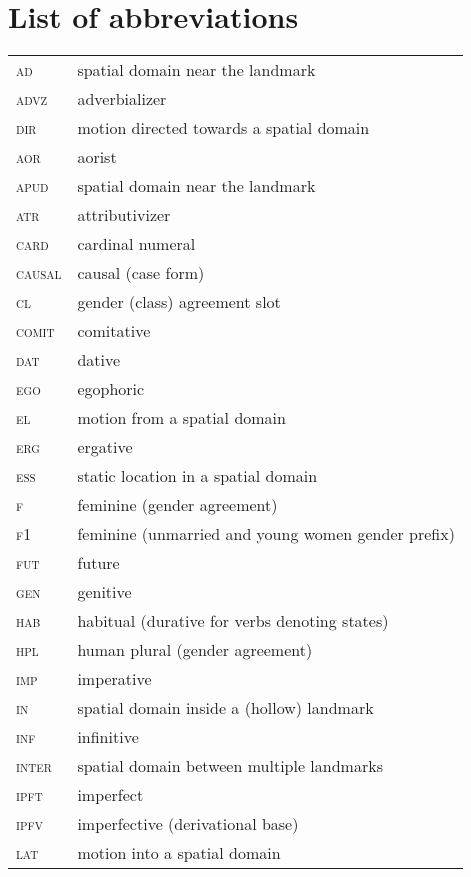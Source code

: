﻿\documentclass[output=paper]{langsci/langscibook}
\begin{document}

\section*{List of abbreviations}

\begin{longtable}[l]{@{}ll@{}}
\textsc{ad}	& spatial domain near the landmark \\
\textsc{advz}	& adverbializer \\
\textsc{dir}	& motion directed towards a spatial domain \\
\textsc{aor}	& aorist \\
\textsc{apud}	& spatial domain near the landmark \\
\textsc{atr}	& attributivizer \\
\textsc{card}	& cardinal numeral \\
\textsc{causal}	& causal (case form) \\
\textsc{cl}	& gender (class) agreement slot \\
\textsc{comit}	& comitative \\
\textsc{dat}	& dative \\
\textsc{ego}	& egophoric \\
\textsc{el}	& motion from a spatial domain \\
\textsc{erg}	& ergative \\
\textsc{ess}	& static location in a spatial domain \\
\textsc{f}	& feminine (gender agreement) \\
\textsc{f1}	& feminine (unmarried and young women gender prefix) \\
\textsc{fut}	& future \\
\textsc{gen}	& genitive \\
\textsc{hab}	& habitual (durative for verbs denoting states) \\
\textsc{hpl}	& human plural (gender agreement) \\
\textsc{imp}	& imperative \\
\textsc{in}	& spatial domain inside a (hollow) landmark \\
\textsc{inf}	& infinitive \\
\textsc{inter}	& spatial domain between multiple landmarks \\
\textsc{ipft}	& imperfect \\
\textsc{ipfv}	& imperfective (derivational base) \\
\textsc{lat}	& motion into a spatial domain \\

\end{longtable}
\end{document}
